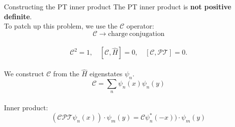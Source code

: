 \documentclass[10pt]{beamer}
\begin{document}
\begin{frame}{Constructing the PT inner product}
The PT inner product is \textbf{not positive definite}.\\
To patch up this problem, we use the $\mathcal{C}$ operator:\\
\begin{equation*}
\mathcal{C} \rightarrow \mathrm{charge\: conjugation}
    \end{equation*}\\
\begin{equation*}
\mathcal{C}^2 = 1,\quad [\mathcal{C}, \hat{H}] = 0,\quad [\mathcal{C},\mathcal{PT}] = 0.
    \end{equation*}\\
\vspace{0.5cm}
We construct $\mathcal{C}$ from the $\hat{H}$ eigenstates $\psi_n$.\\
\begin{equation*}
\mathcal{C} = \sum_{n} \psi_{n}(x) \psi_{n}(y)
    \end{equation*}\\
Inner product: 
\begin{equation*}(\mathcal{CPT} \psi_{n}(x)) \cdot \psi_{m}(y) = \mathcal{C} \psi^{*}_{n}(-x)) \cdot \psi_{m}(y)
\end{equation*}
\end{frame}

\end{document}
